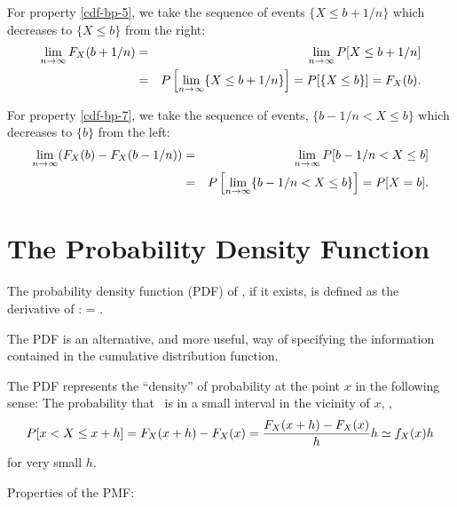 	\item For property \ref{cdf-bp-5},
	we take the sequence of events $\{X\leq b + 1/n\}$
	which decreases to $\{X\leq b\}$
	from the right:
	\begin{eqnarray*}
		\lim_{n\to\infty} F_{X}(b+1/n) &=& \lim_{n\to\infty} P[X\leq b + 1/n]
		\\&=&
		P\left[\lim_{n\to\infty} \{X \leq b + 1/n\}\right] =
		P[\{X\leq b\}] =
		F_{X}(b).
	\end{eqnarray*}

	\item For property \ref{cdf-bp-7},
	we take the sequence of events,
	$\{b-1/n< X \leq b\}$
	which decreases to $\{b\}$
	from the left:
	\begin{eqnarray*}
		\lim_{n\to\infty} (F_{X}(b) - F_{X}(b-1/n))
		&=& \lim_{n\to\infty} P[b-1/n< X\leq b ]
		\\&=&
		P\left[\lim_{n\to\infty} \{b-1/n< X\leq b \}\right]
		=
		P[X=b].
	\end{eqnarray*}
\eit



\section{The Probability Density Function}
\bit
	\item The probability density function (PDF) of \X,
	if it exists, is defined as the derivative of :
		 = .
	\eeql

	\item The PDF is an alternative,
	and more useful,
	way of specifying the information
	contained in the cumulative distribution function.

	\item The PDF represents the ``density'' of probability
	at the point $x$ in the following sense:
	The probability that \X\ is in a small interval
	in the vicinity of $x$,
	\ie,
	\[
		P[x< X\leq x+h]
		= F_{X}(x+h) - F_{X}(x)
		= \frac{F_{X}(x+h) - F_{X}(x)}{h} h
		\simeq  f_{X}(x) h
	\]
	for very small $h$.

	\item Properties of the PMF:

